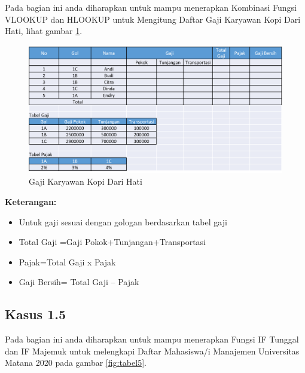 \documentclass[
]{book}
\providecommand{\tightlist}{%
  \setlength{\itemsep}{0pt}\setlength{\parskip}{0pt}}
\begin{document}
Pada bagian ini anda diharapkan untuk mampu menerapkan Kombinasi Fungsi VLOOKUP dan HLOOKUP untuk Mengitung Daftar Gaji Karyawan Kopi Dari Hati, lihat gambar \ref{fig:tabel4}.

\begin{figure}

{\centering \includegraphics[width=1\linewidth]{images/tabel4} 

}

\caption{Gaji Karyawan Kopi Dari Hati}\label{fig:tabel4}
\end{figure}

\textbf{Keterangan:}

\begin{itemize}
\tightlist
\item
  Untuk gaji sesuai dengan gologan berdasarkan tabel gaji
\item
  Total Gaji =Gaji Pokok+Tunjangan+Transportasi
\item
  Pajak=Total Gaji x Pajak
\item
  Gaji Bersih= Total Gaji -- Pajak
\end{itemize}

\hypertarget{kasus-1.5}{%
\subsection*{Kasus 1.5}\label{kasus-1.5}}

Pada bagian ini anda diharapkan untuk mampu menerapkan Fungsi IF Tunggal dan IF Majemuk untuk melengkapi Daftar Mahasiswa/i Manajemen Universitas Matana 2020 pada gambar \ref{fig:tabel5}.
\end{document}
